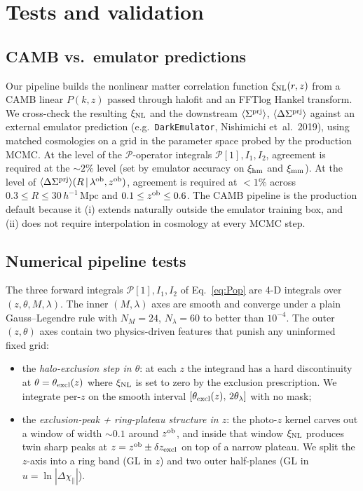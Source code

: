 \documentclass[a4paper, 11pt]{article}
\newcommand{\lob}{\lambda^{\rm ob}}
\newcommand{\zob}{z^{\rm ob}}
\newcommand{\xinl}{\xi_{\rm NL}}
\newcommand{\hMpc}{h^{-1}\,\mathrm{Mpc}}
\newcommand{\Pop}{\mathcal{P}}
\newcommand{\Sprj}{\Sigma^{\rm prj}}
\newcommand{\DSprj}{\Delta\Sigma^{\rm prj}}
\newcommand{\avg}[1]{\langle #1 \rangle}
\begin{document}
\section{Tests and validation}
\label{sec:tests}

\subsection{CAMB vs.\ emulator predictions}
\label{sec:tests:emulator}

Our pipeline builds the nonlinear matter correlation function
$\xinl(r,z)$ from a CAMB linear $P(k,z)$ passed through halofit and an
FFTlog Hankel transform.  We cross-check the resulting $\xinl$ and the
downstream $\avg{\Sprj}$, $\avg{\DSprj}$ against an external emulator
prediction (e.g.\ \texttt{DarkEmulator}, Nishimichi et~al.\ 2019),
using matched cosmologies on a grid in the parameter space probed by
the production MCMC.  At the level of the $\Pop$-operator integrals
$\Pop[1], I_1, I_2$, agreement is required at the
$\sim\!2\%$ level (set by emulator accuracy on $\xi_{\rm hm}$ and
$\xi_{\rm mm}$).  At the level of $\avg{\DSprj}(R\,|\,\lob,\zob)$,
agreement is required at $<\!1\%$ across $0.3\le R\le 30\,\hMpc$ and
$0.1\le\zob\le 0.6$.  The CAMB pipeline is the production default
because it (i) extends naturally outside the emulator training box,
and (ii) does not require interpolation in cosmology at every MCMC
step.

\subsection{Numerical pipeline tests}
\label{sec:tests:numerics}

The three forward integrals $\Pop[1], I_1, I_2$ of
Eq.~\eqref{eq:Pop} are 4-D integrals over $(z,\theta,M,\lambda)$.  The
inner $(M,\lambda)$ axes are smooth and converge under a plain
Gauss--Legendre rule with $N_M=24$, $N_\lambda=60$ to better than
$10^{-4}$.  The outer $(z,\theta)$ axes contain two physics-driven
features that punish any uninformed fixed grid:

\begin{itemize}
\item the \emph{halo-exclusion step in $\theta$}: at each $z$ the
  integrand has a hard discontinuity at
  $\theta=\theta_{\rm excl}(z)$ where $\xinl$ is set to zero by the
  exclusion prescription.  We integrate per-$z$ on the smooth interval
  $[\theta_{\rm excl}(z),\,2\theta_\lambda]$ with no mask;
\item the \emph{exclusion-peak + ring-plateau structure in $z$}: the
  photo-$z$ kernel carves out a window of width $\sim 0.1$ around
  $\zob$, and inside that window $\xinl$ produces twin sharp peaks at
  $z=\zob\pm\delta z_{\rm excl}$ on top of a narrow plateau.  We
  split the $z$-axis into a ring band (GL in $z$) and two outer
  half-planes (GL in $u=\ln|\Delta\chi_\parallel|$).
\end{itemize}
\end{document}
